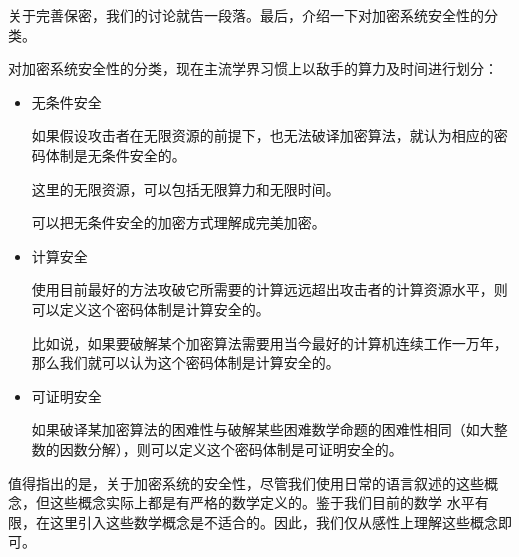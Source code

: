 关于完善保密，我们的讨论就告一段落。最后，介绍一下对加密系统安全性的分类。\par
对加密系统安全性的分类，现在主流学界习惯上以敌手的算力及时间进行划分：
\begin{itemize}
    \item 无条件安全\par
        如果假设攻击者在无限资源的前提下，也无法破译加密算法，就认为相应的密码体制是无条件安全的。\par
        这里的无限资源，可以包括无限算力和无限时间。\par
        可以把无条件安全的加密方式理解成完美加密。
    \item 计算安全\par
        使用目前最好的方法攻破它所需要的计算远远超出攻击者的计算资源水平，则可以定义这个密码体制是计算安全的。\par
        比如说，如果要破解某个加密算法需要用当今最好的计算机连续工作一万年，那么我们就可以认为这个密码体制是计算安全的。
    \item 可证明安全\par
        如果破译某加密算法的困难性与破解某些困难数学命题的困难性相同（如大整数的因数分解），则可以定义这个密码体制是可证明安全的。 
\end{itemize}

值得指出的是，关于加密系统的安全性，尽管我们使用日常的语言叙述的这些概念，但这些概念实际上都是有严格的数学定义的。鉴于我们目前的数学 水平有限，在这里引入这些数学概念是不适合的。因此，我们仅从感性上理解这些概念即可。